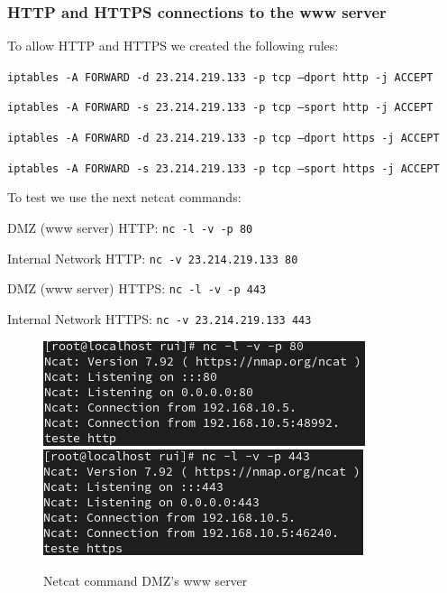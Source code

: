 \documentclass{article}
\begin{document}
\subsubsection{HTTP and HTTPS connections to the www server}
\texttt{}\par
To allow HTTP and HTTPS we created the following rules:

\texttt{}\par
\texttt{iptables -A FORWARD -d 23.214.219.133 -p tcp --dport http -j ACCEPT}\par
\texttt{iptables -A FORWARD -s 23.214.219.133 -p tcp --sport http -j ACCEPT}\par
\texttt{}\par
\texttt{}\par
\texttt{iptables -A FORWARD -d 23.214.219.133 -p tcp --dport https -j ACCEPT}\par
\texttt{iptables -A FORWARD -s 23.214.219.133 -p tcp --sport https -j ACCEPT}\par
\texttt{}\par


To test we use the next netcat commands:
\texttt{}\par
\texttt{}\par
DMZ (www server) HTTP: \texttt{nc -l -v -p 80} \par
Internal Network HTTP: \texttt{nc -v 23.214.219.133 80} \par
\texttt{}\par
\texttt{}\par
DMZ (www server) HTTPS: \texttt{nc -l -v -p 443} \par
Internal Network HTTPS: \texttt{nc -v 23.214.219.133 443} \par
\texttt{}\par
\begin{figure}[H]
    \centering
    \includegraphics[scale=0.5]{btw/btw_http_dmz.png}
    \includegraphics[scale=0.5]{btw/btw_https_dmz.png}
    \caption{Netcat command DMZ's www server}
    \label{fig:network-arc}
\end{figure}
\end{document}
